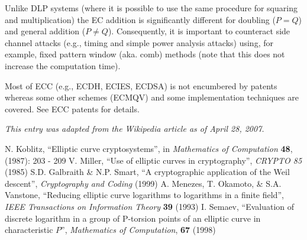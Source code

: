 \documentclass[12pt]{article}
\begin{document}
Unlike DLP systems (where it is possible to use the same procedure for squaring and multiplication) the EC addition is significantly different for doubling ($P = Q$) and general addition ($P \ne Q$). Consequently, it is important to counteract side channel attacks (e.g., timing and simple power analysis attacks) using, for example, fixed pattern window (aka. comb) methods (note that this does not increase the computation time).

Most of ECC (e.g., ECDH, ECIES, ECDSA) is not encumbered by patents whereas some other schemes (ECMQV) and some implementation techniques are covered. See ECC patents for details.

{\it This entry was adapted from the Wikipedia article  as of April 28, 2007.}

\begin{thebibliography}{7}
 N. Koblitz, ``Elliptic curve cryptosystems'', in {\it Mathematics of Computation} {\bf 48}, (1987): 203 - 209
 V. Miller, ``Use of elliptic curves in cryptography'', {\it CRYPTO 85} (1985)
 S.D. Galbraith \& N.P. Smart, ``A cryptographic application of the Weil descent'', {\it Cryptography and Coding} (1999)
 A. Menezes, T. Okamoto, \& S.A. Vanstone, ``Reducing elliptic curve logarithms to logarithms in a finite field'', {\it IEEE Transactions on Information Theory} {\bf 39} (1993)
 I. Semaev, ``Evaluation of discrete logarithm in a group of P-torsion points of an elliptic curve in characteristic $P$'', {\it Mathematics of Computation}, {\bf 67} (1998)
\end{thebibliography}
\end{document}
